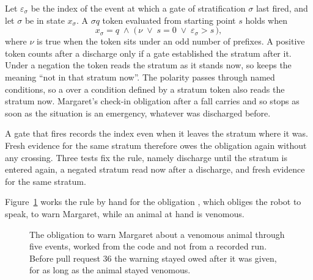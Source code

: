 Let $\varepsilon_\sigma$ be the index of the event at which a gate of stratification $\sigma$ last
fired, and let $\sigma$ be in state $x_\sigma$. A $\sigma$\code{=}$q$ token evaluated
from starting point $s$ holds when
\begin{equation}
x_\sigma = q \;\wedge\; \bigl(\, \nu \;\vee\; s = 0 \;\vee\; \varepsilon_\sigma > s \,\bigr),
\label{eq:stratum-fresh}
\end{equation}
where $\nu$ is true when the token sits under an odd number of  prefixes. A positive
token counts after a discharge only if a gate established the stratum after it. Under a negation the
token reads the stratum as it stands now, so  keeps the meaning ``not in that stratum
now''. The polarity passes through named conditions, so a  over a condition defined
by a stratum token also reads the stratum now. Margaret's check-in obligation after a fall carries
 and so stops as soon as the situation is an
emergency, whatever was discharged before.

A gate that fires records the index even when it leaves the stratum where it was. Fresh evidence for
the same stratum therefore owes the obligation again without any crossing. Three tests fix the rule,
namely discharge until the stratum is entered again, a negated stratum read now after a discharge,
and fresh evidence for the same stratum.

Figure~\ref{fig:runtime-discharge} works the rule by hand for the obligation , which obliges
the robot to speak, to warn Margaret, while an animal at hand is venomous.

\begin{figure}[t]
\centering

\caption{The obligation to warn Margaret about a venomous animal through five events, worked from
the code and not from a recorded run. Before pull request 36 the warning stayed owed after it was
given, for as long as the animal stayed venomous.}
\label{fig:runtime-discharge}
\end{figure}

